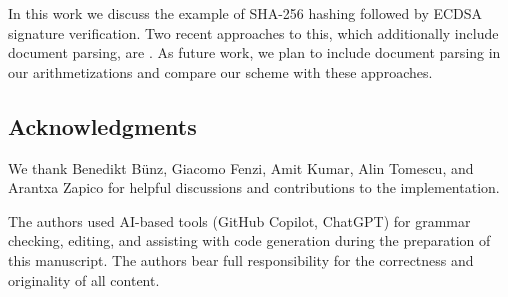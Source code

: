 In this work we discuss the example of SHA-256 hashing followed by ECDSA signature verification. Two recent approaches to this, which additionally include document parsing, are \cite{longfellow,vega}. As future work, we plan to include document parsing in our arithmetizations and compare our scheme with these approaches.

\subsection{Acknowledgments}
\label{sec:zinc-acknowledgments}

We thank Benedikt B\"unz, Giacomo Fenzi, Amit Kumar, Alin Tomescu, and Arantxa Zapico for helpful discussions and contributions to the implementation.

The authors used AI-based tools (GitHub Copilot, ChatGPT) for grammar checking, editing, and assisting with code generation during the preparation of this manuscript. The authors bear full responsibility for the correctness and originality of all content.